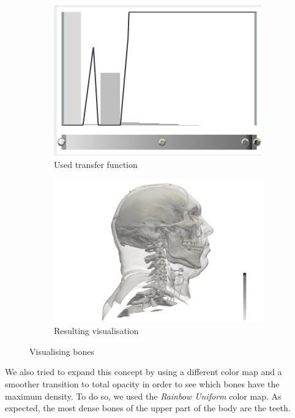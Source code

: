 \documentclass[openany]{article}
\begin{document}
\begin{figure}[h]
	\centering
	\begin{subfigure}{.45\textwidth}
		\centering
		\includegraphics[width=\linewidth]{VisHuman_Head/transfer_function_1}
		\caption{Used transfer function}
	\end{subfigure}%
	\begin{subfigure}{.5\textwidth}
		\centering
		\includegraphics[width=\linewidth]{VisHuman_Head/human_head_1}
		\caption{Resulting visualisation}
	\end{subfigure}
	\caption{Visualising bones}
\end{figure}

We also tried to expand this concept by using a different color map and a smoother transition to total opacity in order to see which bones have the maximum density. To do so, we used the \textit{Rainbow Uniform} color map. As expected, the most dense bones of the upper part of the body are the teeth.
\end{document}
